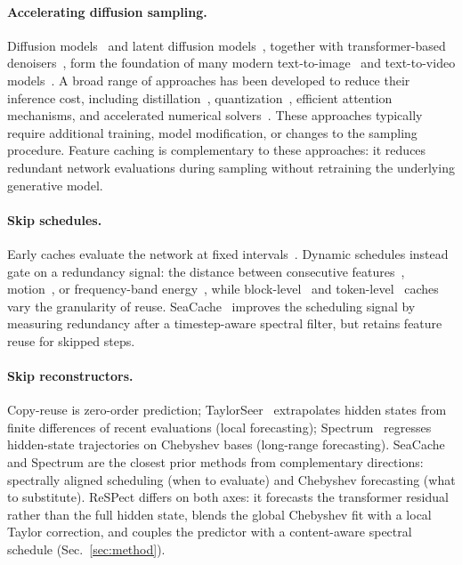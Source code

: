 \documentclass{article} %
\begin{document}
\paragraph{Accelerating diffusion sampling.}
Diffusion models~\citep{ddpm,ddim} and latent diffusion
models~\citep{ldm}, together with transformer-based
denoisers~\citep{dit}, form the foundation of many modern
text-to-image~\citep{flux} and text-to-video
models~\citep{wan,hunyuanvideo}. A broad range of approaches has been
developed to reduce their inference cost, including
distillation~\citep{consistency,dmd},
quantization~\citep{li2023q,zhao2024vidit},
efficient attention mechanisms, and accelerated numerical
solvers~\citep{ddim,dpm}. These approaches typically require additional
training, model modification, or changes to the sampling procedure.
Feature caching is complementary to these approaches: it reduces
redundant network evaluations during sampling without retraining the
underlying generative model.

\paragraph{Skip schedules.}
Early caches evaluate the network at fixed intervals~\citep{fora,pab}.
Dynamic schedules instead gate on a redundancy signal: the distance
between consecutive features~\citep{teacache,dicache},
motion~\citep{adacache}, or frequency-band energy~\citep{freqca}, while
block-level~\citep{deltadit} and token-level~\citep{toca} caches vary
the granularity of reuse. SeaCache~\citep{seacache} improves the
scheduling signal by measuring redundancy after a timestep-aware
spectral filter, but retains feature reuse for skipped steps.

\paragraph{Skip reconstructors.}
Copy-reuse is zero-order prediction; TaylorSeer~\citep{taylorseer}
extrapolates hidden states from finite differences of recent
evaluations (local forecasting); Spectrum~\citep{spectrum} regresses
hidden-state trajectories on Chebyshev bases (long-range
forecasting). SeaCache and Spectrum are the closest prior methods
from complementary directions: spectrally aligned scheduling (when
to evaluate) and Chebyshev forecasting (what to substitute).
ReSPect differs on both axes: it forecasts the transformer residual
rather than the full hidden state, blends the global Chebyshev fit
with a local Taylor correction, and couples the predictor with a
content-aware spectral schedule (Sec.~\ref{sec:method}).
\end{document}
